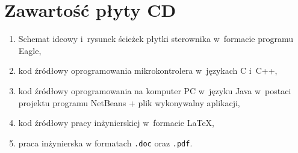 \chapter{Zawartość płyty CD}

\begin{enumerate}
	\item Schemat ideowy i~rysunek ścieżek płytki sterownika w~formacie programu Eagle,
	\item kod źródłowy oprogramowania mikrokontrolera w~językach C i~C++,
	\item kod źródłowy oprogramowania na komputer PC w~języku Java w~postaci projektu programu \mbox{NetBeans} + plik wykonywalny aplikacji,
	\item kod źródłowy pracy inżynierskiej w~formacie \LaTeX,
	\item praca inżynierska w formatach \texttt{.doc} oraz \texttt{.pdf}.
\end{enumerate}
